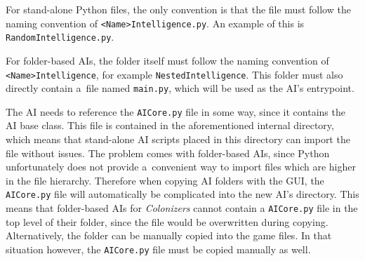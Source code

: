 For stand-alone Python files, the only convention is that the file must follow the naming
convention of \texttt{<Name>Intelligence.py}. An example of this
is \texttt{RandomIntelligence.py}.

For folder-based AIs, the folder itself must follow the naming convention of
\texttt{<Name>Intelligence}, for example \texttt{NestedIntelligence}. This
folder must also directly contain a~file named \texttt{main.py}, which will
be used as the AI's entrypoint.

The AI needs to reference the \texttt{AICore.py}
file in some way, since it contains the AI base class. This file is contained in
the aforementioned internal directory, which means that stand-alone AI scripts
placed in this directory can import the file without issues. The problem comes
with folder-based AIs, since Python unfortunately does not provide a~convenient way
to import files which are higher in the file hierarchy. Therefore when copying
AI folders with the GUI, the \texttt{AICore.py} file will automatically be complicated
into the new AI's directory. This means that folder-based AIs for \emph{Colonizers}
cannot contain a \texttt{AICore.py} file in the top level of their folder,
since the file would be overwritten during copying. Alternatively, the folder
can be manually copied into the game files. In that situation however, the
\texttt{AICore.py} file must be copied manually as well.
